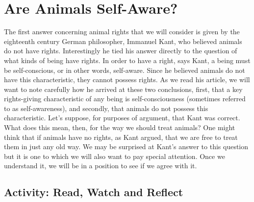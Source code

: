 \documentclass[
]{book}
\begin{document}
\hypertarget{are-animals-self-aware}{%
\section{Are Animals Self-Aware?}\label{are-animals-self-aware}}

The first answer concerning animal rights that we will consider is given by the eighteenth century German philosopher, Immanuel Kant, who believed animals do not have rights. Interestingly he tied his answer directly to the question of what kinds of being have rights. In order to have a right, says Kant, a being must be self-conscious, or in other words, self-aware. Since he believed animals do not have this characteristic, they cannot possess rights. As we read his article, we will want to note carefully how he arrived at these two conclusions, first, that a key rights-giving characteristic of any being is self-consciousness (sometimes referred to as self-awareness), and secondly, that animals do not possess this characteristic. Let's suppose, for purposes of argument, that Kant was correct. What does this mean, then, for the way we should treat animals? One might think that if animals have no rights, as Kant argued, that we are free to treat them in just any old way. We may be surprised at Kant's answer to this question but it is one to which we will also want to pay special attention. Once we understand it, we will be in a position to see if we agree with it.

\hypertarget{activity-read-watch-and-reflect-9}{%
\subsection*{Activity: Read, Watch and Reflect}\label{activity-read-watch-and-reflect-9}}
\end{document}
